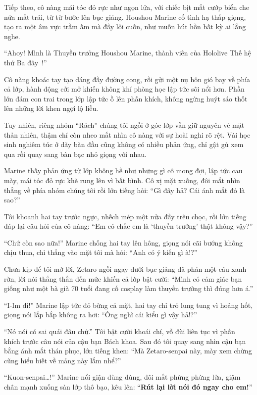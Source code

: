 \documentclass[../main.tex]{subfiles}
\begin{document}
Tiếp theo, cô nàng mái tóc đỏ rực như ngọn lửa, với chiếc bịt mắt cướp biển che nửa mắt trái, từ từ bước lên bục giảng. Houshou Marine cố tình hạ thấp giọng, tạo ra một âm vực trầm ấm mà đầy lôi cuốn, như muốn hút hồn bất kỳ ai lắng nghe.

``Ahoy! Mình là Thuyền trưởng Houshou Marine, thành viên của Hololive Thế hệ thứ Ba đây~!''

Cô nàng khoác tay tạo dáng đầy đường cong, rồi gửi một nụ hôn gió bay về phía cả lớp, hành động cởi mở khiến không khí phòng học lập tức sôi nổi hơn. Phần lớn đám con trai trong lớp lập tức ồ lên phấn khích, không ngừng huýt sáo thốt lên những lời khen ngợi lộ liễu.

Tuy nhiên, riêng nhóm ``Rách'' chúng tôi ngồi ở góc lớp vẫn giữ nguyên vẻ mặt thản nhiên, thậm chí còn nheo mắt nhìn cô nàng với sự hoài nghi rõ rệt. Vài học sinh nghiêm túc ở dãy bàn đầu cũng không có nhiều phản ứng, chỉ gật gù xem qua rồi quay sang bàn bạc nhỏ giọng với nhau.

Marine thấy phản ứng từ lớp không hề như những gì cô mong đợi, lập tức cau mày, mái tóc đỏ rực khẽ rung lên vì bất bình. Cô xị mặt xuống, đôi mắt nhìn thẳng về phía nhóm chúng tôi rồi lớn tiếng hỏi: ``Gì đây hả? Cái ánh mắt đó là sao?''

Tôi khoanh hai tay trước ngực, nhếch mép một nửa đầy trêu chọc, rồi lớn tiếng đáp lại câu hỏi của cô nàng: ``Em có chắc em là `thuyền trưởng' thật không vậy?''

``Chứ còn sao nữa!'' Marine chống hai tay lên hông, giọng nói cãi bướng không chịu thua, chỉ thẳng vào mặt tôi mà hỏi: ``Anh có ý kiến gì à!?''

Chưa kịp để tôi mở lời, Zetaro ngồi ngay dưới bục giảng đã phán một câu xanh rờn, lời nói thẳng thắn đến mức khiến cả lớp bật cười: ``Mình có cảm giác bạn giống như một bà già 70 tuổi đang cố cosplay làm thuyền trưởng thì đúng hơn á.''

``I-Im đi!'' Marine lập tức đỏ bừng cả mặt, hai tay chỉ trỏ lung tung vì hoảng hốt, giọng nói lắp bắp không ra hơi: ``Ông nghĩ cái kiểu gì vậy hả!?''

``Nó nói có sai quái đâu chứ.'' Tôi bật cười khoái chí, vỗ đùi liên tục vì phấn khích trước câu nói của cậu bạn Bách khoa. Sau đó tôi quay sang nhìn cậu bạn bằng ánh mắt thán phục, lớn tiếng khen: ``Mà Zetaro-senpai này, mày xem chừng cũng hiểu biết về mảng này lắm nhể?''

``Kuon-senpai\dots!'' Marine nổi giận đùng đùng, đôi mắt phừng phừng lửa, giậm chân mạnh xuống sàn lớp thô bạo, kêu lên: ``\textbf{Rút lại lời nói đó ngay cho em!}''
\end{document}
